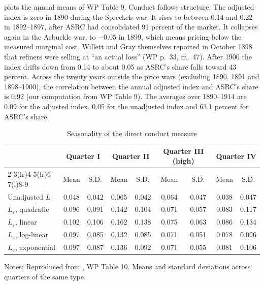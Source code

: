  plots the annual means of WP Table 9. Conduct follows structure. The adjusted
index is zero in 1890 during the Spreckels war. It rises to between 0.14 and 0.22 in 1892--1897, after ASRC
had consolidated 91 percent of the market. It collapses again in the Arbuckle war, to $-0.05$ in 1899,
which means pricing below the measured marginal cost. Willett and Gray themselves reported in October 1898
that refiners were selling at ``an actual loss'' (WP p.~33, fn.~47). After 1900 the index drifts down from
0.14 to about 0.05 as ASRC's share falls toward 43 percent. Across the twenty years outside the price wars (excluding 1890, 1891 and 1898--1900),
the correlation between the annual adjusted index and ASRC's share is 0.92 (our computation from WP Table 9).
The averages over 1890--1914 are 0.09 for the adjusted index, 0.05 for the unadjusted index and 63.1 percent
for ASRC's share.

\begin{table}[htbp]
\centering
\caption{Seasonality of the direct conduct measure}\label{tab:03-gm-seasonality}
\small
\begin{tabular}{@{}lcccccccc@{}}
\toprule
 & \multicolumn{2}{c}{Quarter I} & \multicolumn{2}{c}{Quarter II} & \multicolumn{2}{c}{Quarter III (high)} &
 \multicolumn{2}{c}{Quarter IV}\\
\cmidrule(lr){2-3}\cmidrule(lr){4-5}\cmidrule(lr){6-7}\cmidrule(l){8-9}
 & Mean & S.D. & Mean & S.D. & Mean & S.D. & Mean & S.D.\\
\midrule
Unadjusted $L$ & 0.048 & 0.042 & 0.065 & 0.042 & 0.064 & 0.047 & 0.038 & 0.047\\
$L_\varepsilon$, quadratic & 0.096 & 0.091 & 0.142 & 0.104 & 0.071 & 0.057 & 0.083 & 0.117\\
$L_\varepsilon$, linear & 0.102 & 0.106 & 0.162 & 0.138 & 0.075 & 0.063 & 0.086 & 0.134\\
$L_\varepsilon$, log-linear & 0.097 & 0.085 & 0.132 & 0.085 & 0.071 & 0.051 & 0.078 & 0.096\\
$L_\varepsilon$, exponential & 0.097 & 0.087 & 0.136 & 0.092 & 0.071 & 0.055 & 0.081 & 0.106\\
\bottomrule
\end{tabular}

\smallskip
\begin{minipage}{0.92\textwidth}\footnotesize
Notes: Reproduced from \citet{GenesoveMullin1995}, WP Table 10. Means and standard deviations across
quarters of the same type.
\end{minipage}
\end{table}


